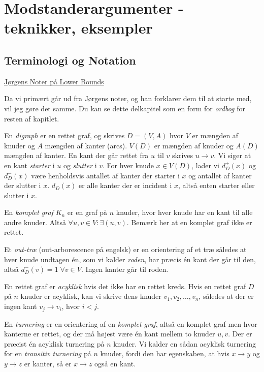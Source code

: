\chapter{Modstanderargumenter - teknikker, eksempler}

\section{Terminologi og Notation}%
\label{sec:terminologi}

\begin{note}[Kilder]
	\href{https://imada.sdu.dk/u/jbj/DM553/LBnoteJBJ21.pdf}{Jørgens Noter på Lower Bounds}
\end{note}

Da vi primært går ud fra Jørgens noter, og han forklarer dem til at starte med, vil jeg gøre det samme. Du kan se dette delkapitel som en form for \textit{ordbog} for resten af kapitlet.

En \textit{digraph} er en rettet graf, og skrives $D = (V,A)$ hvor $V$ er mængden af knuder og $A$ mængden af kanter (arcs). $V(D)$ er mængden af knuder og $A(D)$ mængden af kanter. En kant der går rettet fra $u$ til $v$ skrives $u \rightarrow v$. Vi siger at en kant \textit{starter} i $u$ og \textit{slutter} i $v$. For hver knude $x \in V(D)$, lader vi $d^{+}_{D}(x)$ og $d^{-}_{D}(x)$ være henholdsvis antallet af kanter der starter i $x$ og antallet af kanter der slutter i $x$. $d_{D}(x)$ er alle kanter der er incident i $x$, altså enten starter eller slutter i $x$.

En \textit{komplet graf} $K_{n}$ er en graf på $n$ knuder, hvor hver knude har en kant til alle andre knuder. Altså \(\forall u, v \in V : \exists (u,v)\). Bemærk her at en komplet graf ikke er rettet.

Et \textit{out-træ} (out-arborescence på engelsk) er en orientering af et træ således at hver knude undtagen én, som vi kalder \textit{roden}, har præcis én kant der går til den, altså $d_{D}^{-}(v) = 1 \; \forall v \in V$. Ingen kanter går til roden.

En rettet graf er \textit{acyklisk} hvis det ikke har en rettet kreds. Hvis en rettet graf $D$ på $n$ knuder er acyklisk, kan vi skrive dens knuder $v_{1}, v_{2}, \ldots, v_{n}$, således at der er ingen kant $v_{j} \rightarrow v_{i}$, hvor $i < j$.

En \textit{turnering} er en orientering af en \textit{komplet graf}, altså en komplet graf men hvor kanterne er rettet, og der må højest være én kant mellem to knuder $u, v$. Der er præcist én acyklisk turnering på $n$ knuder. Vi kalder en sådan acyklisk turnering for en \textit{transitiv turnering} på $n$ knuder, fordi den har egenskaben, at hvis $x \rightarrow y$ og $y \rightarrow z$ er kanter, så er $x \rightarrow z$ også en kant.

